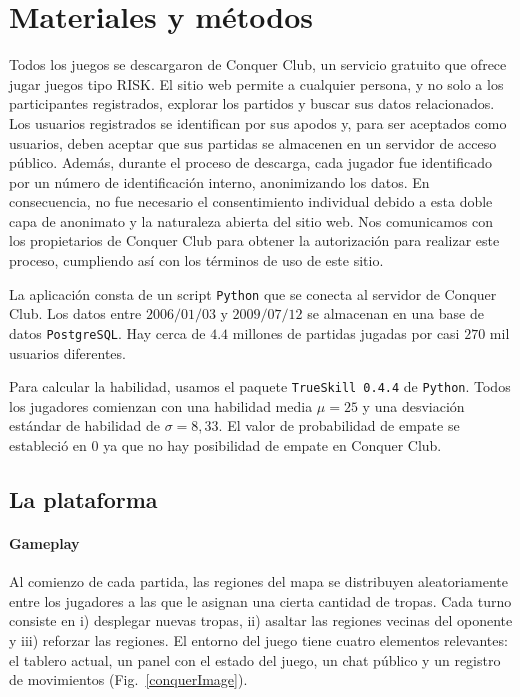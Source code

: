 \documentclass[a4paper,11pt]{book}
\theoremstyle{definition}
\begin{document}
\section{Materiales y m\'etodos}

Todos los juegos se descargaron de Conquer Club, un servicio gratuito que ofrece jugar juegos tipo RISK.
%
El sitio web permite a cualquier persona, y no solo a los participantes registrados, explorar los partidos y buscar sus datos relacionados.
%
Los usuarios registrados se identifican por sus apodos y, para ser aceptados como usuarios, deben aceptar que sus partidas se almacenen en un servidor de acceso p\'ublico.
%
Adem\'as, durante el proceso de descarga, cada jugador fue identificado por un n\'umero de identificaci\'on interno, anonimizando los datos.
%
En consecuencia, no fue necesario el consentimiento individual debido a esta doble capa de anonimato y la naturaleza abierta del sitio web.
%
Nos comunicamos con los propietarios de Conquer Club para obtener la autorizaci\'on para realizar este proceso, cumpliendo as\'i con los t\'erminos de uso de este sitio.


La aplicaci\'on consta de un script \texttt{Python} que se conecta al servidor de Conquer Club.
%
Los datos entre $2006/01/03$ y $2009/07/12$ se almacenan en una base de datos \texttt{PostgreSQL}.
Hay cerca de $4.4$ millones de partidas jugadas por casi $270$ mil usuarios diferentes.

Para calcular la habilidad, usamos el paquete \texttt{TrueSkill 0.4.4} de \texttt{Python}.
%
Todos los jugadores comienzan con una habilidad media $\mu = 25$ y una desviaci\'on est\'andar de habilidad de $\sigma = 8,33$.
%
El valor de probabilidad de empate se estableci\'o en 0 ya que no hay posibilidad de empate en Conquer Club.

\subsection{La plataforma}

\paragraph{Gameplay}\label{sub:gameplay}

Al comienzo de cada partida, las regiones del mapa se distribuyen aleatoriamente entre los jugadores a las que le asignan una cierta cantidad de tropas.
%
Cada turno consiste en i) desplegar nuevas tropas, ii) asaltar las regiones vecinas del oponente y iii) reforzar las regiones.
%
El entorno del juego tiene cuatro elementos relevantes: el tablero actual, un panel con el estado del juego, un chat p\'ublico y un registro de movimientos (Fig.~\ref{conquerImage}).
\end{document}
